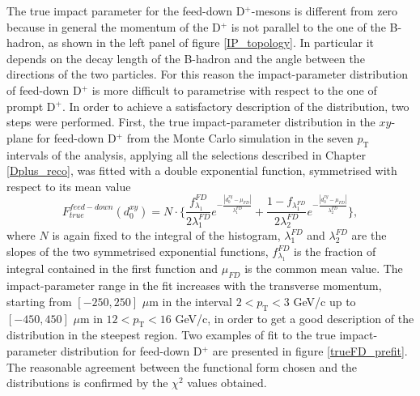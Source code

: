 \documentclass[b5paper,10pt,twoside,oldstyle,classica]{toptesi}
\newcommand{\pt}{p_\text{T}}
\begin{document}
The true impact parameter for the feed-down D$^+$-mesons is different from zero because in general the momentum of the D$^+$ is not parallel to the one of the B-hadron, as shown in the left panel of figure \ref{IP_topology}. In particular it depends on the decay length of the B-hadron and the angle between the directions of the two particles. For this reason the impact-parameter distribution of feed-down D$^+$ is more difficult to parametrise with respect to the one of prompt D$^+$. In order to achieve a satisfactory description of the distribution, two steps were performed. First, the true impact-parameter distribution in the $xy$-plane for feed-down D$^+$ from the Monte Carlo simulation in the seven $\pt$ intervals of the analysis, applying all the selections described in Chapter \ref{Dplus_reco}, was fitted with a double exponential function, symmetrised with respect to its mean value 
\begin{equation}
F^{feed-down}_{true}(d_0^{xy}) = N \cdot \bigg\{\frac{f_{\lambda_1}^{FD}}{2\lambda_1^{FD}}e^{-\frac{|d_0^{xy}-\mu_{FD}|}{\lambda_1^{FD}}}+\frac{1-f_{\lambda_1^{FD}}}{2\lambda_2^{FD}}e^{-\frac{|d_0^{xy}-\mu_{FD}|}{\lambda_2^{FD}}}\bigg\},
\label{trueFD_func}
\end{equation}
where $N$ is again fixed to the integral of the histogram, $\lambda_1^{FD}$ and $\lambda_2^{FD}$ are the slopes of the two symmetrised exponential functions, $f_{\lambda_1}^{FD}$ is the fraction of integral contained in the first function and $\mu_{FD}$ is the common mean value. The impact-parameter range in the fit increases with the transverse momentum, starting from $[-250,250]$ $\mu$m in the interval $2<\pt<3$ GeV/c up to $[-450,450]$ $\mu$m in $12<\pt<16$ GeV/c, in order to get a good description of the distribution in the steepest region. Two examples of fit to the true impact-parameter distribution for feed-down D$^+$ are presented in figure \ref{trueFD_prefit}. The reasonable agreement between the functional form chosen and the distributions is confirmed by the $\chi^2$ values obtained. 
\end{document}
